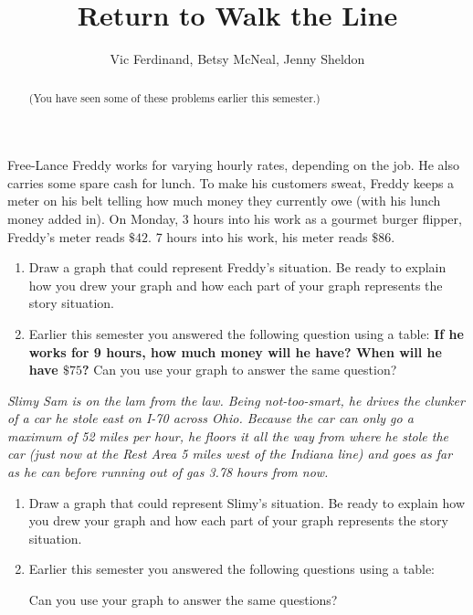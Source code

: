 \documentclass[nooutcomes]{ximera}
\title{Return to Walk the Line}
\author{Vic Ferdinand, Betsy McNeal, Jenny Sheldon}
\begin{document}
\begin{abstract}
 (You have seen some of these problems earlier this semester.)
\end{abstract}
\maketitle



\begin{problem}
 Free-Lance Freddy works for varying hourly rates, depending on the
job.  He also carries some spare cash for lunch.  To make his
customers sweat, Freddy keeps a meter on his belt telling how much
money they currently owe (with his lunch money added in).  On Monday, 3 hours into his work as a gourmet burger flipper,
  Freddy's meter reads $\$42$. 7 hours into his work, his meter reads
  $\$86$.  
  \begin{enumerate}
  \item Draw a graph that could represent Freddy's situation. Be ready to explain how you drew your graph and how each part of your graph represents the story situation.
  \item Earlier this semester you answered the following question using a table:  {\bf If he works for 9 hours, how much money will he have?  When
  will he have $\$75$?}  Can you use your graph to answer the same question?
  \end{enumerate}
\end{problem}


\begin{problem}
\emph{Slimy Sam is on the lam from the law.  Being not-too-smart, he drives
the clunker of a car he stole east on I-70 across Ohio.  Because the
car can only go a maximum of 52 miles per hour, he floors it all the
way from where he stole the car (just now at the Rest Area 5 miles
west of the Indiana line) and goes as far as he can before running out
of gas 3.78 hours from now.}
 \begin{enumerate}
  \item Draw a graph that could represent Slimy's situation.  Be ready to explain how you drew your graph and how each part of your graph represents the story situation.

  \item Earlier this semester you answered the following questions using a table:  
Can you use your graph to answer the same questions?

\end{enumerate}

\end{problem}
\end{document}
